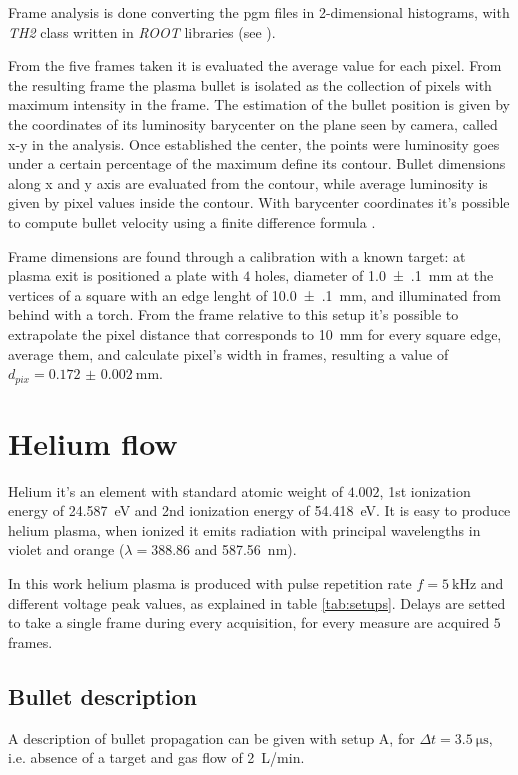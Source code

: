 Frame analysis is done converting the pgm files in 2-dimensional histograms, with \emph{TH2} class written in \emph{ROOT} libraries (see \cite{ROOT:TH2}).

From the five frames taken it is evaluated the average value for each pixel. From the resulting frame the plasma bullet is isolated as the collection of pixels with maximum intensity in the frame. The estimation of the bullet position is given by the coordinates of its luminosity barycenter on the plane seen by camera, called x-y in the analysis.
Once established the center, the points were luminosity goes under a certain percentage of the maximum define its contour. Bullet dimensions along x and y axis are evaluated from the contour, while average luminosity is given by pixel values inside the contour.
With barycenter coordinates it's possible to compute bullet velocity using a finite difference formula \cite{Bhadauria}.


Frame dimensions are found through a calibration with a known target: at plasma exit is positioned a plate with $4$ holes, diameter of \SI{1.0(1)}{\milli\meter} at the vertices of a square with an edge lenght of \SI{10.0(1)}{\milli\meter}, and illuminated from behind with a torch.
From the frame relative to this setup it's possible to extrapolate the pixel distance that corresponds to \SI{10}{\milli\meter} for every square edge, average them, and calculate pixel's width in frames, resulting a value of $d_{pix} = \SI{0.172(2)}{\milli\meter}$.


\section{Helium flow}
Helium it's an element with standard atomic weight of $\num{4.002}$, 1st ionization energy of \SI{24.587}{\electronvolt} and 2nd ionization energy of \SI{54.418}{\electronvolt}.
It is easy to produce helium plasma, when ionized it emits radiation with principal wavelengths in violet and orange ($\lambda = \num{388.86}$ and \SI{587.56}{\nano\meter}).

In this work helium plasma is produced with pulse repetition rate $f = \SI{5}{\kilo\hertz}$ and different voltage peak values, as explained in table \ref{tab:setups}.
Delays are setted to take a single frame during every acquisition, for every measure are acquired $5$ frames.

\subsection{Bullet description}
A description of bullet propagation can be given with setup A, for $\Delta t = \SI{3.5}{\micro\second}$, i.e. absence of a target and gas flow of \SI{2}{\liter/\minute}.

